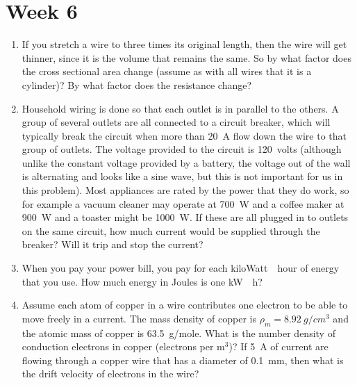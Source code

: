 \section*{Week 6}
\begin{enumerate}
\setlength\itemsep{2 in}
\setcounter{enumi}{\value{counter}}
\item 
If you stretch a wire to three times its original length, then the wire will get thinner, since it is the volume that remains the same. So by what factor does the cross sectional area change (assume as with all wires that it is a cylinder)? By what factor does the resistance change?


\item
Household wiring is done so that each outlet is in parallel to the others. A group of several outlets are all connected to a circuit breaker, which will typically break the circuit when more than \SI{20}{\ampere} flow down the wire to that group of outlets. The voltage provided to the circuit is \SI{120}{volts} (although unlike the constant voltage provided by a battery, the voltage out of the wall is alternating and looks like a sine wave, but this is not important for us in this problem). Most appliances are rated by the power that they do work, so for example a vacuum cleaner may operate at \SI{700}{\watt} and a coffee maker at \SI{900}{\watt} and a toaster might be \SI{1000}{\watt}. If these are all plugged in to outlets on the same circuit, how much current would be supplied through the breaker? Will it trip and stop the current?

\item
When you pay your power bill, you pay for each \si{kiloWatt\cdot hour} of energy that you use. How much energy in \si{Joules} is one \si{\kilo \watt\cdot \hour}?


\item 
Assume each atom of copper in a wire contributes one electron to be able to move freely in a current. The mass density of copper is $\rho_m = \SI{8.92}{g/cm^3}$ and the atomic mass of copper is \SI{63.5}{g/mole}. What is the number density of conduction electrons in copper (electrons per m$^3$)? If \SI{5}{\ampere} of current are flowing through a copper wire that has a diameter of \SI{0.1}{mm}, then what is the drift velocity of electrons in the wire?
\setcounter{counter}{\value{enumi}}
\end{enumerate}

\vspace{2in}
